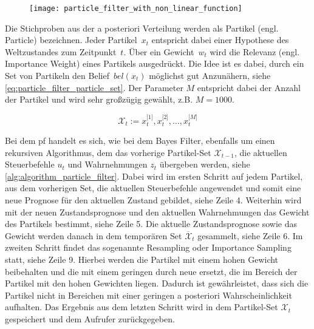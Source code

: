 \begin{figure}
	\centering
	\texttt{[image: particle\_filter\_with\_non\_linear\_function]}
	\label{fig:particle_filter_with_non_linear_function}
\end{figure}

Die Stichproben aus der a posteriori Verteilung werden als Partikel (engl. Particle) bezeichnen. Jeder Partikel~$x_t$ entspricht dabei einer Hypothese des Weltzustandes zum Zeitpunkt~$t$. Über ein Gewicht~$w_t$ wird die Relevanz (engl. Importance Weight) eines Partikels ausgedrückt. Die Idee ist es dabei, durch ein Set von Partikeln den Belief~$bel(x_t)$ möglichst gut Anzunähern, siehe \autoref{eq:particle_filter_particle_set}. Der Parameter $M$ entspricht dabei der Anzahl der Partikel und wird sehr großzügig gewählt, z.B. $M=1000$.

\begin{equation}
\mathcal{X}_t := x^{\lbrack 1 \rbrack}_t, x^{\lbrack 2 \rbrack}_t, \ldots, x^{\lbrack M \rbrack}_t \label{eq:particle_filter_particle_set}
\end{equation}

Bei dem \Gls{pf} handelt es sich, wie bei dem Bayes Filter, ebenfalls um einen rekursiven Algorithmus, dem das vorherige Partikel-Set $\mathcal{X}_{t-1}$, die aktuellen Steuerbefehle $u_t$ und Wahrnehmungen $z_t$ übergeben werden, siehe \autoref{alg:algorithm_particle_filter}. Dabei wird im ersten Schritt auf jedem Partikel, aus dem vorherigen Set, die aktuellen Steuerbefehle angewendet und somit eine neue Prognose für den aktuellen Zustand gebildet, siehe Zeile 4. Weiterhin wird mit der neuen Zustandsprognose und den aktuellen Wahrnehmungen das Gewicht des Partikels bestimmt, siehe Zeile 5. Die aktuelle Zustandsprognose sowie das Gewicht werden danach in dem temporären Set $\overline{\mathcal{X}}_t$ gesammelt, siehe Zeile 6. Im zweiten Schritt findet das sogenannte Resampling oder Importance Sampling statt, siehe Zeile 9. Hierbei werden die Partikel mit einem hohen Gewicht beibehalten und die mit einem geringen durch neue ersetzt, die im Bereich der Partikel mit den hohen Gewichten liegen. Dadurch ist gewährleistet, dass sich die Partikel nicht in Bereichen mit einer geringen a posteriori Wahrscheinlichkeit aufhalten. Das Ergebnis aus dem letzten Schritt wird in dem Partikel-Set $\mathcal{X}_t$ gespeichert und dem Aufrufer zurückgegeben.

